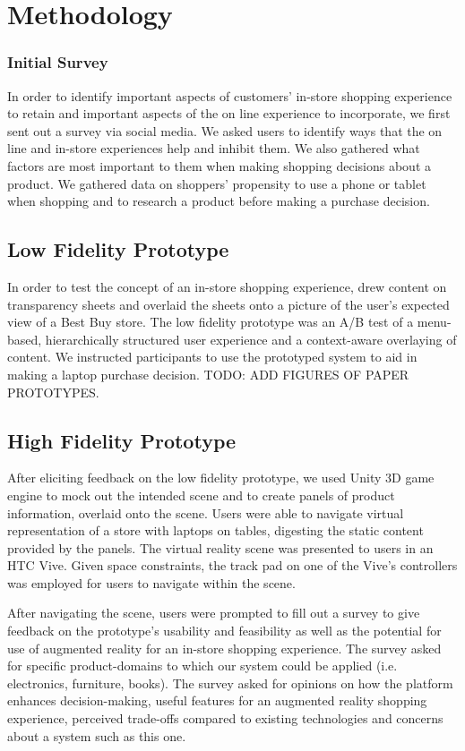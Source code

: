 \section{Methodology}

\subsubsection{Initial Survey}

In order to identify important aspects of customers' in-store shopping experience to retain and important aspects of the on line experience to incorporate, we first sent out a survey via social media.  We asked users to identify ways that the on line and in-store experiences help and inhibit them.  We also gathered what factors are most important to them when making shopping decisions about a product.  We gathered data on shoppers' propensity to use a phone or tablet when shopping and to research a product before making a purchase decision.

\subsection{Low Fidelity Prototype}

In order to test the concept of an in-store shopping experience, drew content on transparency sheets and overlaid the sheets onto a picture of the user's expected view of a Best Buy store.  The low fidelity prototype was an A/B test of a menu-based, hierarchically structured user experience and a context-aware overlaying of content.  We instructed participants to use the prototyped system to aid in making a laptop purchase decision. TODO: ADD FIGURES OF PAPER PROTOTYPES.

\subsection{High Fidelity Prototype}

After eliciting feedback on the low fidelity prototype, we used Unity 3D game engine to mock out the intended scene and to create panels of product information, overlaid onto the scene.  Users were able to navigate virtual representation of a store with laptops on tables, digesting the static content provided by the panels.  The virtual reality scene was presented to users in an HTC Vive.  Given space constraints, the track pad on one of the Vive's controllers was employed for users to navigate within the scene.

After navigating the scene, users were prompted to fill out a survey to give feedback on the prototype's usability and feasibility as well as the potential for use of augmented reality for an in-store shopping experience.  The survey asked for specific product-domains to which our system could be applied (i.e. electronics, furniture, books).  The survey asked for opinions on how the platform enhances decision-making, useful features for an augmented reality shopping experience, perceived trade-offs compared to existing technologies and concerns about a system such as this one.
